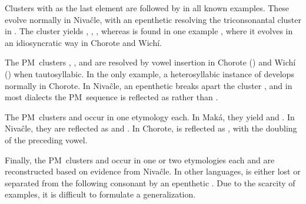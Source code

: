 \begin{exe}
    \ex \earcw \label{xt-earcw}
    \ex \cavy \label{nxt-cavy}
    \ex \spring \label{xn-spring}
    \ex \straw \label{xp-straw}
    \ex \fox \label{xm-fox}
    \ex \shadow \label{xp-shadow}
    \ex \moon \label{xw-moon}
    \ex \femalebreast \label{xt-femalebreast}
\end{exe}

Clusters with  as the last element are followed by  in all known examples. These evolve normally in Nivaĉle, with an epenthetic  resolving the triconsonantal cluster in . The cluster  yields , , , whereas  is found in one example , where it evolves in an idiosyncratic way in Chorote and Wichí.

\begin{exe}
    \ex \kingvulture \label{stw-kingvulture}
    \ex \anteater
    \ex \likelove
\end{exe}

The PM~clusters ,  , and   are resolved by vowel insertion in Chorote () and Wichí () when tautosyllabic. In the only example, a heterosyllabic instance of  develops normally in Chorote. In Nivaĉle, an epenthetic  breaks apart the cluster , and in most dialects the PM~sequence  is reflected as  rather than .

\begin{exe}
    \ex \mesh
    \ex \wildcat
    \ex \blind
    \ex \widower
\end{exe}

The PM~clusters  and  occur in one etymology each. In Maká, they yield  and . In Nivaĉle, they are reflected as  and . In Chorote,  is reflected as , with the doubling of the preceding vowel.

\begin{exe}
    \ex \welln
    \ex \willow
\end{exe}

Finally, the PM~clusters  and  occur in one or two etymologies each and are reconstructed based on evidence from Nivaĉle. In other languages,  is either lost or separated from the following consonant by an epenthetic . Due to the scarcity of examples, it is difficult to formulate a generalization.

